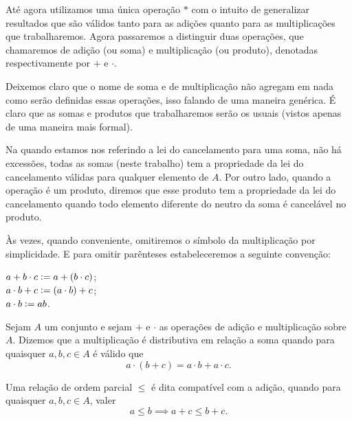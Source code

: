 \documentclass[../main.tex]{subfiles}
\begin{document}
Até agora utilizamos uma única operação $*$ com o intuito de generalizar resultados que são válidos tanto para as adições quanto para as multiplicações que trabalharemos. Agora passaremos a distinguir duas operações, que chamaremos de adição (ou soma) e multiplicação (ou produto), denotadas respectivamente por $+$ e $\cdot$.

Deixemos claro que o nome de soma e de multiplicação não agregam em nada como serão definidas essas operações, isso falando de uma maneira genérica. É claro que as somas e produtos que trabalharemos serão os usuais (vistos apenas de uma maneira mais formal).

\begin{obs}
    Na  quando estamos nos referindo a lei do cancelamento para uma soma, não há excessões, todas as somas (neste trabalho) tem a propriedade da lei do cancelamento válidas para qualquer elemento de $A$. Por outro lado, quando a operação é um produto, diremos que esse produto tem a propriedade da lei do cancelamento quando todo elemento diferente do neutro da soma é cancelável no produto.
\end{obs}

\begin{obs}
	Às vezes, quando conveniente, omitiremos o símbolo da multiplicação por simplicidade. E para omitir parênteses estabeleceremos a seguinte convenção: 
	\begin{center}
    	$a + b \cdot c \vcentcolon= a + (b \cdot c)$;  \\
    	$a \cdot b + c \vcentcolon= (a \cdot b) + c$; \\
    	$a \cdot b \vcentcolon= ab$.    
	\end{center}
\end{obs}

\begin{defi}
    Sejam $A$ um conjunto e sejam $+$ e $\cdot$ as operações de adição e multiplicação sobre $A$. Dizemos que a multiplicação é distributiva em relação a soma quando para quaisquer $a, b, c \in A$ é válido que \[ a \cdot (b + c) = a \cdot b + a\cdot c. \]
\end{defi}

\begin{defi}
    Uma relação de ordem parcial $\leq$ é dita compatível com a adição, quando para quaisquer $a,b,c \in A$, 
    valer \[ a \leq b \implies a + c \leq b + c. \]
\end{defi}
\end{document}
